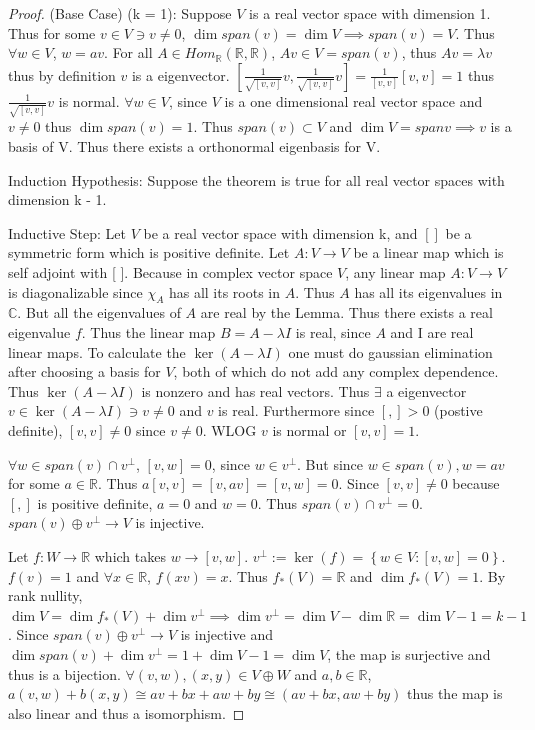 \documentclass{article}
\newcommand{\C}{\mathbb{C}}
\newcommand{\R}{\mathbb{R}}
\begin{document}
\begin{proof}
    (Base Case) (k = 1): Suppose $V$ is a real vector space with dimension 1. Thus for some $v \in V \ni v \neq 0$, $\dim span(v) = \dim V \implies span(v) = V$. Thus $\forall w \in V$, $w = av$. For all $A \in Hom_\R(\R, \R)$, $Av \in V = span(v)$, thus $Av = \lambda v$ thus by definition $v$ is a eigenvector. $[\frac{1}{\sqrt{[v, v]}} v, \frac{1}{\sqrt{[v, v]}} v] = \frac{1}{[v,v]} [v, v] = 1$ thus $\frac{1}{\sqrt{[v, v]}} v$ is normal. $\forall w \in V$, since $V$ is a one dimensional real vector space and $v \neq 0$ thus $\dim span(v) = 1$. Thus $span(v) \subset V$ and $\dim V = span v \implies v$ is a basis of V. Thus there exists a orthonormal eigenbasis for V. 
    
    Induction Hypothesis: Suppose the theorem is true for all real vector spaces with dimension k - 1.

    Inductive Step: Let $V$ be a real vector space with dimension k, and $[ ]$ be a symmetric form which is positive definite. Let $A: V \to V$ be a linear map which is self adjoint with [ ]. Because in complex vector space $V$, any linear map $A : V \to V$ is diagonalizable since $\chi_{A}$ has all its roots in $A$. Thus $A$ has all its eigenvalues in $\C$. But all the eigenvalues of $A$ are real by the Lemma. Thus there exists a real eigenvalue $f$. Thus the linear map $B = A - \lambda I$ is real, since $A$ and I are real linear maps. To calculate the $\ker(A - \lambda I)$ one must do gaussian elimination after choosing a basis for $V$, both of which do not add any complex dependence. Thus $\ker(A - \lambda I)$ is nonzero and has real vectors. Thus $\exists$ a eigenvector $v \in \ker(A - \lambda I) \ni v \neq 0 $ and $v$ is real. Furthermore since $[ , ] > 0$ (postive definite), $[v,v] \neq 0$ since $v \neq 0$.  WLOG $v$ is normal or $[v, v] = 1$.

    
    $\forall w \in span(v) \cap v^\perp$, $[v, w] = 0$, since $w \in v^\perp$. But since $w \in span(v), w = av$ for some $a \in \R$. Thus $a [v, v] = [v, av] = [v, w] = 0$. Since $[v ,v] \neq 0$ because $[, ]$ is positive definite, $a = 0$ and $w = 0$. Thus $span(v) \cap v^\perp = 0$. $span(v) \oplus v^\perp \to V$ is injective.
    
    Let $f : W \to \R$ which takes $w \to [v, w]$. $v^\perp := \ker(f) = \left\{ w \in V : [v, w] = 0 \right\}$. $f(v) = 1$ and $\forall x \in \R$, $f(xv) = x$. Thus $f_*(V) = \R$ and $\dim f_*(V) = 1$. By rank nullity, $\dim V = \dim f_*(V) + \dim v^\perp \implies \dim v^\perp = \dim V - \dim \R = \dim V -1 = k - 1$. Since $span(v) \oplus v^\perp \to V$ is injective and $\dim span(v) + \dim v^\perp = 1 + \dim V - 1 = \dim V$, the map is surjective and thus is a bijection. $\forall (v, w), (x, y) \in V \oplus W $ and $a, b \in \R$, $a(v, w) + b(x, y) \cong av + bx + aw + by \cong (av + bx, aw + by)$ thus the map is also linear and thus a isomorphism. 
    

\end{proof}
\end{document}
